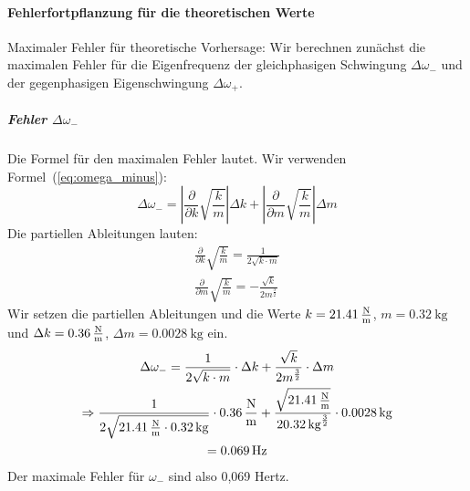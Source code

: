 \documentclass{article}
\begin{document}
              \paragraph{Fehlerfortpflanzung für die theoretischen Werte}
                  Maximaler Fehler für theoretische Vorhersage:
                  Wir berechnen zunächst die maximalen Fehler für die Eigenfrequenz der gleichphasigen Schwingung \(\Delta \omega_{-}\) und der gegenphasigen Eigenschwingung \(\Delta \omega_{+}\).

                  \subparagraph{Fehler \(\Delta \omega_{-}\)}
                  Die Formel für den maximalen Fehler lautet. Wir verwenden Formel~(\ref{eq:omega_minus}):
                  \begin{equation}
                      \Delta \omega_{-} = \left| \frac{\partial}{\partial k} \sqrt{\frac{k}{m}} \right| \Delta k + \left| \frac{\partial}{\partial m} \sqrt{\frac{k}{m}} \right| \Delta m
                  \end{equation}
                  Die partiellen Ableitungen lauten:
                  \begin{equation}
                      \begin{gathered}
                          \frac{\partial}{\partial k} \sqrt{\frac{k}{m}} = \frac{1}{2 \sqrt{k \cdot m}} \\
                          \frac{\partial}{\partial m} \sqrt{\frac{k}{m}} = - \frac{\sqrt{k}}{2 m^{\frac{3}{2}}}
                      \end{gathered}
                  \end{equation}
                  Wir setzen die partiellen Ableitungen und die Werte \(k = \SI{21.41}{\frac{\newton}{\metre}} \), \(m = \SI{0.32}{\kilogram} \) und \(\Delta k = \SI{0.36}{\frac{\newton}{\metre}} \), \(\Delta m = \SI{0.0028}{\kilogram} \) ein.
                  \begin{equation}
                      \begin{gathered}
                          \Delta \omega_{-} = \frac{1}{2 \sqrt{k \cdot m}} \cdot \Delta k + \frac{\sqrt{k}}{2 m^{\frac{3}{2}}} \cdot \Delta m \\
                          \Rightarrow \frac{1}{2 \sqrt{ \SI{21.41}{\frac{\newton}{\metre}} \cdot \SI{0.32}{\kilogram} }} \cdot \SI{0.36}{\frac{\newton}{\metre}}
                          + \frac{\sqrt{ \SI{21.41}{\frac{\newton}{\metre}} }}{2 {\SI{0.32}{\kilogram}}^{\frac{3}{2}}} \cdot \SI{0.0028}{\kilogram} \\
                          = \SI{0.069}{\hertz} \\ %
                      \end{gathered}
                  \end{equation}
                  Der maximale Fehler für \(\omega_{-}\) sind also 0,069 Hertz.
\end{document}
